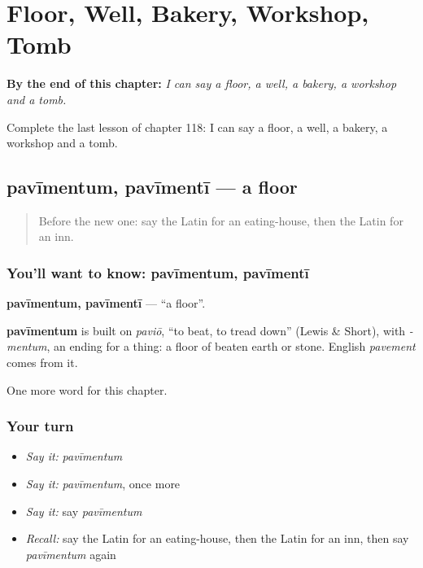 
\chapter{Floor, Well, Bakery, Workshop, Tomb}
\label{ch:la-floor-well-bakery-workshop-tomb}

\begin{chapteropening}
\textbf{By the end of this chapter:} \emph{I can say a floor, a well, a bakery, a workshop and a tomb.}

Complete the last lesson of chapter 118: I can say a floor, a well, a bakery, a workshop and a tomb.
\end{chapteropening}

\section[pavīmentum, pavīmentī]{pavīmentum, pavīmentī — a floor}

\label{lesson:LA-C118-pavimentum}



\begin{quote}
Before the new one: say the Latin for an eating-house, then the Latin for an inn.
\end{quote}

\subsection*{You'll want to know: pavīmentum, pavīmentī}
\textbf{pavīmentum, pavīmentī} — \textquotedblleft{}a floor\textquotedblright{}.

\begin{cousinweb}
\textbf{pavīmentum} is built on \emph{paviō}, \textquotedblleft{}to beat, to tread down\textquotedblright{} (Lewis \& Short), with \emph{-mentum}, an ending for a thing: a floor of beaten earth or stone. English \emph{pavement} comes from it.
\end{cousinweb}

\begin{grammarlens}[title={What you've built}]
One more word for this chapter.
\end{grammarlens}

\subsection*{Your turn}
\begin{itemize}
\raggedright
  \item \emph{Say it:} \emph{pavīmentum}
  \item \emph{Say it:} \emph{pavīmentum}, once more
  \item \emph{Say it:} say \emph{pavīmentum}
  \item \emph{Recall:} say the Latin for an eating-house, then the Latin for an inn, then say \emph{pavīmentum} again
\end{itemize}

